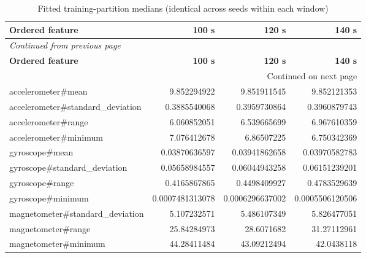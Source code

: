 \documentclass[10pt,a4paper]{article}
\begin{document}
\begin{longtable}{@{}p{}rrr@{}}
\caption{Fitted training-partition medians (identical across seeds within each window)}\\
\toprule
\textbf{Ordered feature} & \textbf{100 s} & \textbf{120 s} & \textbf{140 s} \\
\midrule\endfirsthead
\multicolumn{4}{l}{\small\itshape Continued from previous page}\\
\toprule
\textbf{Ordered feature} & \textbf{100 s} & \textbf{120 s} & \textbf{140 s} \\
\midrule\endhead
\midrule\multicolumn{4}{r}{\small Continued on next page}\\\endfoot
\bottomrule\endlastfoot
accelerometer\#mean & 9.852294922 & 9.851911545 & 9.852121353 \\
accelerometer\#standard\_\allowbreak{}deviation & 0.3885540068 & 0.3959730864 & 0.3960879743 \\
accelerometer\#range & 6.060852051 & 6.539665699 & 6.967610359 \\
accelerometer\#minimum & 7.076412678 & 6.86507225 & 6.750342369 \\
gyroscope\#mean & 0.03870636597 & 0.03941862658 & 0.03970582783 \\
gyroscope\#standard\_\allowbreak{}deviation & 0.05658984557 & 0.06044943258 & 0.06151239201 \\
gyroscope\#range & 0.4165867865 & 0.4498409927 & 0.4783529639 \\
gyroscope\#minimum & 0.0007481313078 & 0.0006296637002 & 0.0005506120506 \\
magnetometer\#standard\_\allowbreak{}deviation & 5.107232571 & 5.486107349 & 5.826477051 \\
magnetometer\#range & 25.84284973 & 28.6071682 & 31.27112961 \\
magnetometer\#minimum & 44.28411484 & 43.09212494 & 42.0438118 \\
\end{longtable}\endgroup
\begingroup\small\setlength{\tabcolsep}{4pt}\renewcommand{\arraystretch}{1.12}
\end{document}
